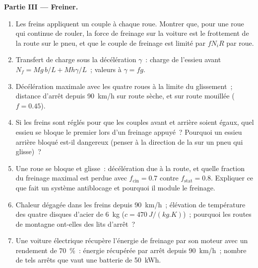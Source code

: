 \begin{problem}
\medskip
\noindent\textbf{Partie III --- Freiner.}
\begin{enumerate}[resume]
  \item Les freins appliquent un couple à chaque roue. Montrer que, pour une roue
        qui continue de rouler, la force de freinage sur la voiture est le
        frottement de la route sur le pneu, et que le couple de freinage est
        limité par $fN_iR$ par roue.
  \item Transfert de charge sous la décélération $\gamma$~: charge de l'essieu avant
        $N_f = Mg\,b/L + Mh\gamma/L$~; valeurs à $\gamma = fg$.
  \item Décélération maximale avec les quatre roues à la limite du
        glissement~; distance d'arrêt depuis \qty{90}{km/h} sur route sèche, et
        sur route mouillée ($f = 0.45$).
  \item Si les freins sont réglés pour que les couples avant et arrière soient égaux,
        quel essieu se bloque le premier lors d'un freinage appuyé~? Pourquoi un essieu
        arrière bloqué est-il dangereux (penser à la direction de la 
        sur un pneu qui glisse)~?
  \item Une roue se bloque et glisse~: décélération due à la route, et quelle
        fraction du freinage maximal est perdue avec $f_{\text{cin}} =
        0.7$ contre $f_{\text{stat}} = 0.8$. Expliquer ce que fait un système
        antiblocage et pourquoi il module le freinage.
  \item Chaleur dégagée dans les freins depuis \qty{90}{km/h}~; élévation de
        température des quatre disques d'acier de \qty{6}{kg} ($c = \qty{470}{J/(kg.K)}$)~;
        pourquoi les routes de montagne ont-elles des lits d'arrêt~?
  \item Une voiture électrique récupère l'énergie de freinage par son moteur avec un
        rendement de \qty{70}{\%}~: énergie récupérée par arrêt depuis
        \qty{90}{km/h}~; nombre de tels arrêts que vaut une batterie de \qty{50}{kWh}.
\end{enumerate}


\end{problem}
